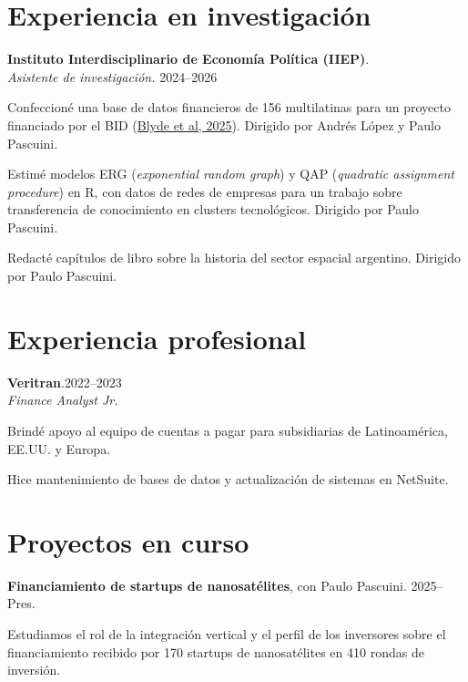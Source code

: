 \documentclass[11pt]{article}
\newcommand{\entrydate}[1]{\hfill{\small{#1}}}
\begin{document}
\section{Experiencia en investigación}
\textbf{Instituto Interdisciplinario de Economía Política (IIEP)}.
\\
\textit{Asistente de investigación.} \entrydate{2024--2026}
\begin{cvitems}
    \item Confeccioné una base de datos financieros de 156 multilatinas para un proyecto financiado por el BID (\href{https://publications.iadb.org/es/multilatinas-en-movimiento-caracteristicas-motivaciones-y-lineamientos-de-politica}{Blyde et al, 2025}). Dirigido por Andrés López y Paulo Pascuini.
    \item Estimé modelos ERG (\textit{exponential random graph}) y QAP (\textit{quadratic assignment procedure}) en R, con datos de redes de empresas para un trabajo sobre transferencia de conocimiento en clusters tecnológicos. Dirigido por Paulo Pascuini.
    \item Redacté capítulos de libro sobre la historia del sector espacial argentino. Dirigido por Paulo Pascuini.
\end{cvitems}

\section{Experiencia profesional}
\textbf{Veritran}.\entrydate{2022--2023}\\
\textit{Finance Analyst Jr.}
\begin{cvitems}
  \item Brindé apoyo al equipo de cuentas a pagar para subsidiarias de Latinoamérica, EE.UU. y Europa.
  \item Hice mantenimiento de bases de datos y actualización de sistemas en NetSuite.
\end{cvitems}

\section{Proyectos en curso}
\textbf{Financiamiento de startups de nanosatélites}, con Paulo Pascuini. \entrydate{2025--Pres.}
\begin{cvitems}
  \item Estudiamos el rol de la integración vertical y el perfil de los inversores sobre el financiamiento recibido por 170 startups de nanosatélites en 410 rondas de inversión.
\end{cvitems}
\end{document}

